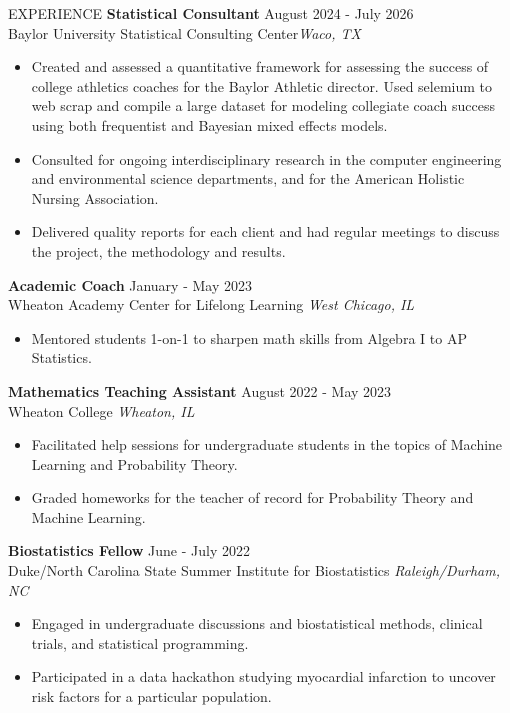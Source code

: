 \documentclass{resume} %
\begin{document}
\begin{rSection}{EXPERIENCE}
\textbf{Statistical Consultant} \hfill August 2024 - July 2026\\
Baylor University Statistical Consulting Center\hfill \textit{Waco, TX}
 \begin{itemize}
    \itemsep -3pt {}
     \item Created and assessed a quantitative framework for assessing the success of college athletics coaches for the Baylor Athletic director. Used selemium to web scrap and compile a large dataset for modeling collegiate coach success using both frequentist and Bayesian mixed effects models.
     \item Consulted for ongoing interdisciplinary research in the computer engineering and environmental science departments, and for the American Holistic Nursing Association.
     \item Delivered quality reports for each client and had regular meetings to discuss the project, the methodology and results.
 \end{itemize}

\textbf{Academic Coach} \hfill January - May 2023\\
Wheaton Academy Center for Lifelong Learning \hfill \textit{West Chicago, IL}
 \begin{itemize}
    \itemsep -3pt {}
     \item Mentored students 1-on-1 to sharpen math skills from Algebra I to AP Statistics.
 \end{itemize}

\textbf{Mathematics Teaching Assistant} \hfill August 2022 - May 2023\\
Wheaton College \hfill \textit{Wheaton, IL}
 \begin{itemize}
    \itemsep -3pt {}
     \item Facilitated help sessions for undergraduate students in the topics of Machine Learning and Probability Theory.
     \item Graded homeworks for the teacher of record for Probability Theory and Machine Learning.
 \end{itemize}

 \textbf{Biostatistics Fellow} \hfill June - July 2022\\
 Duke/North Carolina State Summer Institute for Biostatistics \hfill \textit{Raleigh/Durham, NC}
 \begin{itemize}
    \itemsep -3pt {}
     \item Engaged in undergraduate discussions and biostatistical methods, clinical trials, and statistical programming.
     \item Participated in a data hackathon studying myocardial infarction to uncover risk factors for a particular population.
 \end{itemize}

\end{rSection}
\end{document}
